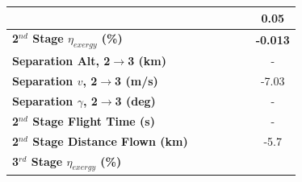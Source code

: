 \begin{table}[ht]
\begin{tabular}{l c c c c c c}
		& \firstsecondSeparationgammamSPARTANNinetyNoReturn
		& \firstsecondSeparationgammamSPARTANNinetyFiveNoReturn
		& \firstsecondSeparationgammamSPARTANStandardNoReturn
		& \firstsecondSeparationgammamSPARTANOneHundredFiveNoReturn
		& \firstsecondSeparationgammamSPARTANOneHundredTenNoReturn
		&0.05
		\\
		\hline 
		\textbf{2$^{nd}$ Stage $\eta_{exergy}$ (\%)}
		& \textbf{\secondExergyEffmSPARTANNinetyNoReturn}
		& \textbf{\secondExergyEffmSPARTANNinetyFiveNoReturn}
		& \textbf{\secondExergyEffmSPARTANStandardNoReturn}
		& \textbf{\secondExergyEffmSPARTANOneHundredFiveNoReturn}
		& \textbf{\secondExergyEffmSPARTANOneHundredTenNoReturn}
		& \textbf{-0.013}
		\\
		\textbf{Separation Alt, 2$\rightarrow$3 (km)}
		& \secondthirdSeparationAltmSPARTANNinetyNoReturn
		& \secondthirdSeparationAltmSPARTANNinetyFiveNoReturn
		& \secondthirdSeparationAltmSPARTANStandardNoReturn
		& \secondthirdSeparationAltmSPARTANOneHundredFiveNoReturn
		& \secondthirdSeparationAltmSPARTANOneHundredTenNoReturn
		& -
		\\
		\textbf{Separation $v$, 2$\rightarrow$3 (m/s)}
		& \secondthirdSeparationvmSPARTANNinetyNoReturn
		& \secondthirdSeparationvmSPARTANNinetyFiveNoReturn
		& \secondthirdSeparationvmSPARTANStandardNoReturn
		& \secondthirdSeparationvmSPARTANOneHundredFiveNoReturn
		& \secondthirdSeparationvmSPARTANOneHundredTenNoReturn
		&-7.03
		\\
		\textbf{Separation $\gamma$, 2$\rightarrow$3 (deg)}
		& \secondthirdSeparationgammamSPARTANNinetyNoReturn
		& \secondthirdSeparationgammamSPARTANNinetyFiveNoReturn
		& \secondthirdSeparationgammamSPARTANStandardNoReturn
		& \secondthirdSeparationgammamSPARTANOneHundredFiveNoReturn
		& \secondthirdSeparationgammamSPARTANOneHundredTenNoReturn
		& -
		\\
		\textbf{2$^{nd}$ Stage Flight Time (s)}
		& \secondFlightTimemSPARTANNinetyNoReturn
		& \secondFlightTimemSPARTANNinetyFiveNoReturn
		& \secondFlightTimemSPARTANStandardNoReturn
		& \secondFlightTimemSPARTANOneHundredFiveNoReturn
		& \secondFlightTimemSPARTANOneHundredTenNoReturn
		& -
		\\
		\textbf{2$^{nd}$ Stage Distance Flown (km)}
		& \SecondDistmSPARTANNinetyNoReturn
		& \SecondDistmSPARTANNinetyFiveNoReturn
		& \SecondDistmSPARTANStandardNoReturn
		& \SecondDistmSPARTANOneHundredFiveNoReturn
		& \SecondDistmSPARTANOneHundredTenNoReturn
		&-5.7
		\\
		\hline 
		\textbf{3$^{rd}$ Stage $\eta_{exergy}$ (\%)}
		& \textbf{\thirddExergyEffmSPARTANNinetyNoReturn}

\end{tabular}
\end{table}
